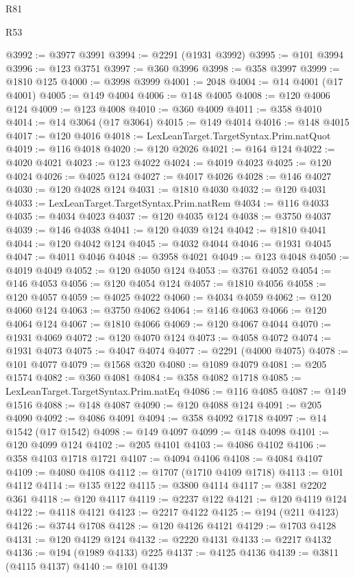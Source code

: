 \begin{lexlean}{R81}
\begin{lexlean}{R53}
\begin{coremodule}
{{{{{{{{{{{{{{{{{{{{{{{{{{{{{{{{{{{{{{{{{{{{{{{{{{{{{{{{{{{{{{{{{{{{{{{{{{{{{{{{{{{{{{{{{{{{{{{{{{{{{{{{{{{{{{{{@3992 := @3977 @3991
@3994 := @2291 (@1931 @3992)
@3995 := @101 @3994
@3996 := @123 @3751
@3997 := @360 @3996
@3998 := @358 @3997
@3999 := @1810 @125
@4000 := @3998 @3999
@4001 := 2048
@4004 := @14 @4001 (@17 @4001)
@4005 := @149 @4004
@4006 := @148 @4005
@4008 := @120 @4006 @124
@4009 := @123 @4008
@4010 := @360 @4009
@4011 := @358 @4010
@4014 := @14 @3064 (@17 @3064)
@4015 := @149 @4014
@4016 := @148 @4015
@4017 := @120 @4016
@4018 := LexLeanTarget.TargetSyntax.Prim.natQuot
@4019 := @116 @4018
@4020 := @120 @2026
@4021 := @164 @124
@4022 := @4020 @4021
@4023 := @123 @4022
@4024 := @4019 @4023
@4025 := @120 @4024
@4026 := @4025 @124
@4027 := @4017 @4026
@4028 := @146 @4027
@4030 := @120 @4028 @124
@4031 := @1810 @4030
@4032 := @120 @4031
@4033 := LexLeanTarget.TargetSyntax.Prim.natRem
@4034 := @116 @4033
@4035 := @4034 @4023
@4037 := @120 @4035 @124
@4038 := @3750 @4037
@4039 := @146 @4038
@4041 := @120 @4039 @124
@4042 := @1810 @4041
@4044 := @120 @4042 @124
@4045 := @4032 @4044
@4046 := @1931 @4045
@4047 := @4011 @4046
@4048 := @3958 @4021
@4049 := @123 @4048
@4050 := @4019 @4049
@4052 := @120 @4050 @124
@4053 := @3761 @4052
@4054 := @146 @4053
@4056 := @120 @4054 @124
@4057 := @1810 @4056
@4058 := @120 @4057
@4059 := @4025 @4022
@4060 := @4034 @4059
@4062 := @120 @4060 @124
@4063 := @3750 @4062
@4064 := @146 @4063
@4066 := @120 @4064 @124
@4067 := @1810 @4066
@4069 := @120 @4067 @4044
@4070 := @1931 @4069
@4072 := @120 @4070 @124
@4073 := @4058 @4072
@4074 := @1931 @4073
@4075 := @4047 @4074
@4077 := @2291 (@4000 @4075)
@4078 := @101 @4077
@4079 := @1568 @320
@4080 := @1089 @4079
@4081 := @205 @1574
@4082 := @360 @4081
@4084 := @358 @4082 @1718
@4085 := LexLeanTarget.TargetSyntax.Prim.natEq
@4086 := @116 @4085
@4087 := @149 @1516
@4088 := @148 @4087
@4090 := @120 @4088 @124
@4091 := @205 @4090
@4092 := @4086 @4091
@4094 := @358 @4092 @1718
@4097 := @14 @1542 (@17 @1542)
@4098 := @149 @4097
@4099 := @148 @4098
@4101 := @120 @4099 @124
@4102 := @205 @4101
@4103 := @4086 @4102
@4106 := @358 @4103 @1718 @1721
@4107 := @4094 @4106
@4108 := @4084 @4107
@4109 := @4080 @4108
@4112 := @1707 (@1710 @4109 @1718)
@4113 := @101 @4112
@4114 := @135 @122
@4115 := @3800 @4114
@4117 := @381 @2202 @361
@4118 := @120 @4117
@4119 := @2237 @122
@4121 := @120 @4119 @124
@4122 := @4118 @4121
@4123 := @2217 @4122
@4125 := @194 (@211 @4123)
@4126 := @3744 @1708
@4128 := @120 @4126 @4121
@4129 := @1703 @4128
@4131 := @120 @4129 @124
@4132 := @2220 @4131
@4133 := @2217 @4132
@4136 := @194 (@1989 @4133) @225
@4137 := @4125 @4136
@4139 := @3811 (@4115 @4137)
@4140 := @101 @4139
}}}}}}}}}}}}}}}}}}}}}}}}}}}}}}}}}}}}}}}}}}}}}}}}}}}}}}}}}}}}}}}}}}}}}}}}}}}}}}}}}}}}}}}}}}}}}}}}}}}}}}}}}}}}}}}}
\end{coremodule}
\end{lexlean}
\end{lexlean}
